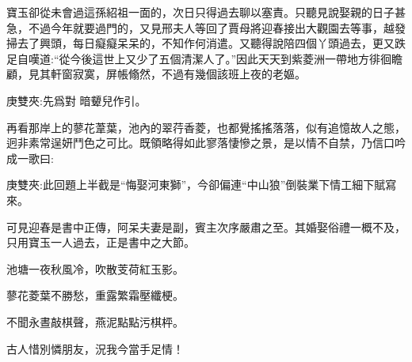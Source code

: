 \begin{parag}
    寶玉卻從未會過這孫紹祖一面的，次日只得過去聊以塞責。只聽見說娶親的日子甚急，不過今年就要過門的，又見邢夫人等回了賈母將迎春接出大觀園去等事，越發掃去了興頭，每日癡癡呆呆的，不知作何消遣。又聽得說陪四個丫頭過去，更又跌足自嘆道:“從今後這世上又少了五個清潔人了。”因此天天到紫菱洲一帶地方徘徊瞻顧，見其軒窗寂寞，屏帳翛然，不過有幾個該班上夜的老嫗。\begin{note}庚雙夾:先爲對 暗顰兒作引。\end{note}再看那岸上的蓼花葦葉，池內的翠荇香菱，也都覺搖搖落落，似有追憶故人之態，迥非素常逞妍鬥色之可比。既領略得如此寥落悽慘之景，是以情不自禁，乃信口吟成一歌曰:\begin{note}庚雙夾:此回題上半截是“悔娶河東獅”，今卻偏連“中山狼”倒裝業下情工細下賦寫來。\end{note}\begin{note}可見迎春是書中正傳，阿呆夫妻是副，賓主次序嚴肅之至。其婚娶俗禮一概不及，只用寶玉一人過去，正是書中之大節。\end{note}
\end{parag}


\begin{poem}
    \begin{pl}池塘一夜秋風冷，吹散芰荷紅玉影。\end{pl}

    \begin{pl}蓼花菱葉不勝愁，重露繁霜壓纖梗。\end{pl}

    \begin{pl}不聞永晝敲棋聲，燕泥點點污棋枰。\end{pl}

    \begin{pl}古人惜別憐朋友，況我今當手足情！\end{pl}

\end{poem}


